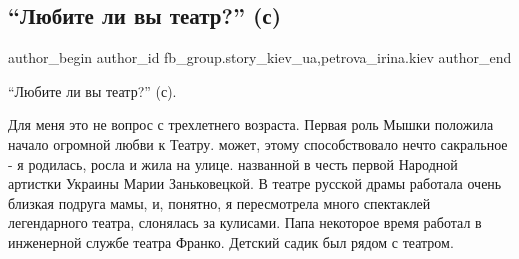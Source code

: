 
 
 
 
 
 
\subsection{\enquote{Любите ли вы театр?} (с)}
\label{sec:16_01_2022.fb.fb_group.story_kiev_ua.1.ljubite_li_vy_teatr}
 
\ifcmt
 author_begin
   author_id fb_group.story_kiev_ua,petrova_irina.kiev
 author_end
\fi

\enquote{Любите ли вы театр?} (с). 

Для меня это не вопрос с трехлетнего возраста. Первая роль Мышки положила
начало огромной любви к Театру. может, этому способствовало нечто сакральное -
я родилась, росла и жила на улице. названной в честь первой Народной артистки
Украины Марии Заньковецкой. В театре русской драмы работала очень близкая
подруга мамы, и, понятно, я пересмотрела много спектаклей легендарного театра,
слонялась за кулисами. Папа некоторое время работал в инженерной службе театра
Франко. Детский садик был рядом с театром.

\raggedcolumns
\begin{multicols}{3} %
\setlength{\parindent}{0pt}





\end{multicols} %

